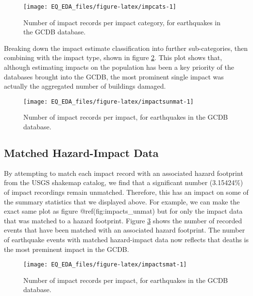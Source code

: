 \documentclass[
]{article}
\begin{document}
\begin{figure}
\texttt{[image: EQ\_EDA\_files/figure-latex/impcats-1]} \caption[Number of impact records per impact category, for earthquakes in the GCDB database]{Number of impact records per impact category, for earthquakes in the GCDB database.}\label{fig:impcats}
\end{figure}

Breaking down the impact estimate classification into further sub-categories, then combining with the impact type, shown in figure \ref{fig:impactsunmat}. This plot shows that, although estimating impacts on the population has been a key priority of the databases brought into the GCDB, the most prominent single impact was actually the aggregated number of buildings damaged.

\begin{figure}
\texttt{[image: EQ\_EDA\_files/figure-latex/impactsunmat-1]} \caption[Number of impact records per impact, for earthquakes in the GCDB database]{Number of impact records per impact, for earthquakes in the GCDB database.}\label{fig:impactsunmat}
\end{figure}

\hypertarget{matched-hazard-impact-data}{%
\subsection{Matched Hazard-Impact Data}\label{matched-hazard-impact-data}}

By attempting to match each impact record with an associated hazard footprint from the USGS shakemap catalog, we find that a significant number (3.15424\%) of impact recordings remain unmatched. Therefore, this has an impact on some of the summary statistics that we displayed above. For example, we can make the exact same plot as figure @ref(fig:impacts\_unmat) but for only the impact data that was matched to a hazard footprint. Figure \ref{fig:impactsmat} shows the number of recorded events that have been matched with an associated hazard footprint. The number of earthquake events with matched hazard-impact data now reflects that deaths is the most preminent impact in the GCDB.

\begin{figure}
\texttt{[image: EQ\_EDA\_files/figure-latex/impactsmat-1]} \caption[Number of impact records per impact, for earthquakes in the GCDB database]{Number of impact records per impact, for earthquakes in the GCDB database.}\label{fig:impactsmat}
\end{figure}
\end{document}
